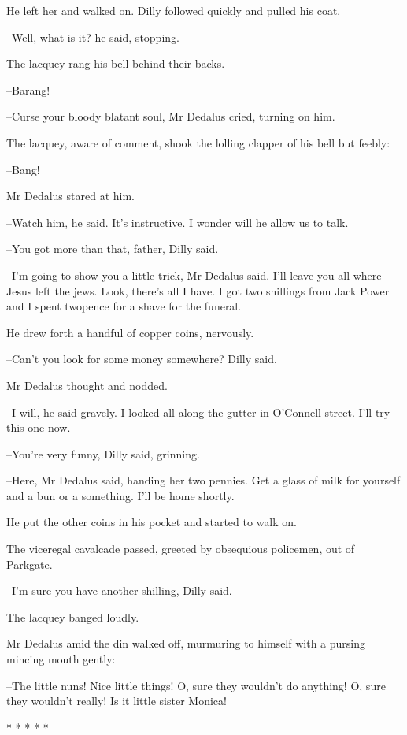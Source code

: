 He left her and walked on. Dilly followed quickly and pulled his coat.

--Well, what is it? he said, stopping.

The lacquey rang his bell behind their backs.

--Barang!

--Curse your bloody blatant soul, Mr Dedalus cried, turning on him.

The lacquey, aware of comment, shook the lolling clapper of his bell
but feebly:

--Bang!

Mr Dedalus stared at him.

--Watch him, he said. It's instructive. I wonder will he allow us to talk.

--You got more than that, father, Dilly said.

--I'm going to show you a little trick, Mr Dedalus said. I'll leave you
all where Jesus left the jews. Look, there's all I have. I got two
shillings from Jack Power and I spent twopence for a shave for the
funeral.

He drew forth a handful of copper coins, nervously.

--Can't you look for some money somewhere? Dilly said.

Mr Dedalus thought and nodded.

--I will, he said gravely. I looked all along the gutter in O'Connell
street. I'll try this one now.

--You're very funny, Dilly said, grinning.

--Here, Mr Dedalus said, handing her two pennies. Get a glass of milk for
yourself and a bun or a something. I'll be home shortly.

He put the other coins in his pocket and started to walk on.

The viceregal cavalcade passed, greeted by obsequious policemen, out
of Parkgate.

--I'm sure you have another shilling, Dilly said.

The lacquey banged loudly.

Mr Dedalus amid the din walked off, murmuring to himself with a
pursing mincing mouth gently:

--The little nuns! Nice little things! O, sure they wouldn't do anything!
O, sure they wouldn't really! Is it little sister Monica!


    * * * * *


